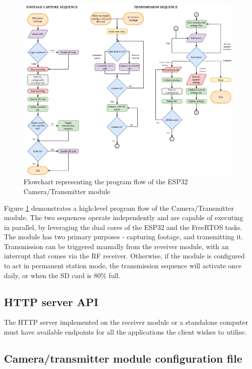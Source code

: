 \begin{figure}[ht]
    \centering
    \includegraphics[width=\columnwidth]{"Images/ESP-flow.png"}
    \caption{Flowchart representing the program flow of the ESP32 Camera/Transmitter module}
    \label{fig:espflow}
\end{figure}

Figure \ref{fig:espflow} demonstrates a high-level program flow of the Camera/Transmitter module. The two sequences operate independently and are capable of executing in parallel, by leveraging the dual cores of the ESP32 and the FreeRTOS tasks. The module has two primary purposes - capturing footage, and transmitting it. Transmission can be triggered manually from the reveiver module, with an interrupt that comes via the RF receiver. Otherwise, if the module is configured to act in permanent station mode, the transmission sequence will activate once daily, or when the SD card is 80\% full.

\subsection{HTTP server API}

The HTTP server implemented on the receiver module or a standalone computer must have available endpoints for all the applications the client wishes to utilise.

\subsection{Camera/transmitter module configuration file}

